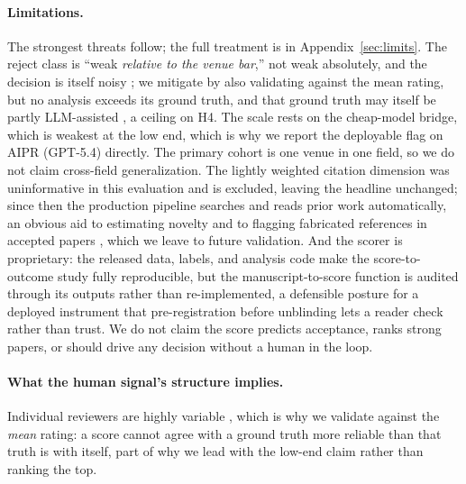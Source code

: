 \paragraph{Limitations.}
The strongest threats follow; the full treatment is in Appendix~\ref{sec:limits}. The
reject class is ``weak \emph{relative to the venue bar},'' not weak absolutely, and the
decision is itself noisy \citep{cortes2021inconsistency,beygelzimer2023arbitrary}; we
mitigate by also validating against the mean rating, but no analysis exceeds its ground
truth, and that ground truth may itself be partly LLM-assisted
\citep{liang2024monitoring}, a ceiling on H4. The scale rests on the cheap-model bridge,
which is weakest at the low end, which is why we report the deployable flag on AIPR
(GPT-5.4) directly. The primary cohort is one venue in one field, so we do not claim
cross-field generalization. The lightly weighted citation dimension was uninformative in this
evaluation and is excluded, leaving the headline unchanged; since then the production pipeline
searches and reads prior work automatically, an obvious aid to estimating novelty and to
flagging fabricated references in accepted papers \citep{neurips2025citations}, which we leave
to future validation. And the scorer is proprietary: the released data, labels, and
analysis code make the score-to-outcome study fully reproducible, but the
manuscript-to-score function is audited through its outputs rather than re-implemented, a
defensible posture for a deployed instrument that pre-registration before unblinding lets
a reader check rather than trust. We do not claim the score predicts acceptance, ranks
strong papers, or should drive any decision without a human in the loop.

\paragraph{What the human signal's structure implies.}
Individual reviewers are highly variable \citep{reviewbench2026}, which is why we validate
against the \emph{mean} rating: a score cannot agree with a ground truth more reliable
than that truth is with itself, part of why we lead with the low-end claim rather than
ranking the top.
